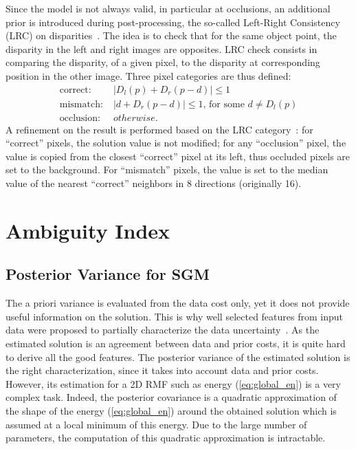 \documentclass{article}
\begin{document}
Since the model is not always valid, in particular at occlusions, an additional prior is introduced during post-processing, the so-called Left-Right Consistency (LRC) on disparities~\cite{mei11}. The idea is to check that for the same object point, the disparity in the left and right images are opposites. LRC check consists in comparing the disparity, of a given pixel, to the disparity at corresponding position in the other image. Three pixel categories are thus defined:
\begin{equation}
\begin{split}
\text{correct}: & \; |D_l(p) + D_r(p- d)| \leq 1 \\
\text{mismatch}: & \; |d + D_r(p- d)| \leq 1,\,\text{for some } d\neq D_l(p)\\
\text{occlusion}: & \; otherwise.
\end{split}
\end{equation}
A refinement on the result is performed based on the LRC category~\cite{zbontar16}: for ``correct'' pixels, the solution value is not modified; for any ``occlusion'' pixel, the value is copied from the closest ``correct'' pixel at its left, thus occluded pixels are set to the background. For ``mismatch'' pixels, the value is set to the median value of the nearest ``correct'' neighbors in 8 directions (originally 16).

\section{Ambiguity Index}

\subsection{Posterior Variance for SGM}

The a priori variance is evaluated from the data cost only, yet it does not provide useful information on the solution. This is why well selected features from input data were proposed to partially characterize the data uncertainty~\cite{hu12}. As the estimated solution is an agreement between data and prior costs, it is quite hard to derive all the good features. The posterior variance of the estimated solution is the right characterization, since it takes into account data and prior costs. However, its estimation for a 2D RMF such as energy (\ref{eq:global_en}) is a very complex task. Indeed, the posterior covariance is a quadratic approximation of the shape of the energy (\ref{eq:global_en}) around the obtained solution which is assumed at a local minimum of this energy. Due to the large number of parameters, the computation of this quadratic approximation is intractable.
\end{document}
